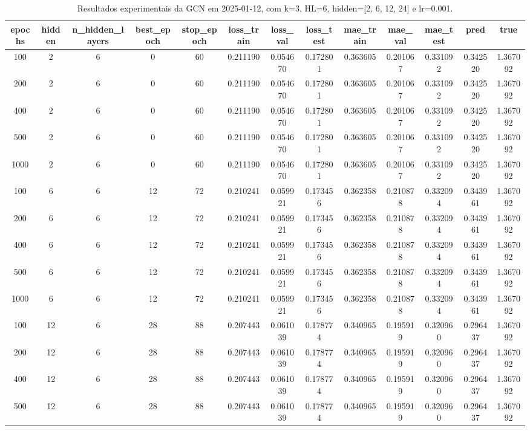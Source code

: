 \begin{table}[h]
\centering
\caption{Resultados experimentais da GCN em 2025-01-12, com k=3, HL=6, hidden=[2, 6, 12, 24] e lr=0.001.}
\label{tab:gcn_results_k3_hl6_d20250112}
\begin{tabular}{ccccccccccccc}
\toprule
epochs & hidden & n\_hidden\_layers & best\_epoch & stop\_epoch & loss\_train & loss\_val & loss\_test & mae\_train & mae\_val & mae\_test & pred & true \\
\midrule
100 & 2 & 6 & 0 & 60 & 0.211190 & 0.054670 & 0.172801 & 0.363605 & 0.201067 & 0.331092 & 0.342520 & 1.367092 \\
200 & 2 & 6 & 0 & 60 & 0.211190 & 0.054670 & 0.172801 & 0.363605 & 0.201067 & 0.331092 & 0.342520 & 1.367092 \\
400 & 2 & 6 & 0 & 60 & 0.211190 & 0.054670 & 0.172801 & 0.363605 & 0.201067 & 0.331092 & 0.342520 & 1.367092 \\
500 & 2 & 6 & 0 & 60 & 0.211190 & 0.054670 & 0.172801 & 0.363605 & 0.201067 & 0.331092 & 0.342520 & 1.367092 \\
1000 & 2 & 6 & 0 & 60 & 0.211190 & 0.054670 & 0.172801 & 0.363605 & 0.201067 & 0.331092 & 0.342520 & 1.367092 \\
100 & 6 & 6 & 12 & 72 & 0.210241 & 0.059921 & 0.173456 & 0.362358 & 0.210878 & 0.332094 & 0.343961 & 1.367092 \\
200 & 6 & 6 & 12 & 72 & 0.210241 & 0.059921 & 0.173456 & 0.362358 & 0.210878 & 0.332094 & 0.343961 & 1.367092 \\
400 & 6 & 6 & 12 & 72 & 0.210241 & 0.059921 & 0.173456 & 0.362358 & 0.210878 & 0.332094 & 0.343961 & 1.367092 \\
500 & 6 & 6 & 12 & 72 & 0.210241 & 0.059921 & 0.173456 & 0.362358 & 0.210878 & 0.332094 & 0.343961 & 1.367092 \\
1000 & 6 & 6 & 12 & 72 & 0.210241 & 0.059921 & 0.173456 & 0.362358 & 0.210878 & 0.332094 & 0.343961 & 1.367092 \\
100 & 12 & 6 & 28 & 88 & 0.207443 & 0.061039 & 0.178774 & 0.340965 & 0.195919 & 0.320960 & 0.296437 & 1.367092 \\
200 & 12 & 6 & 28 & 88 & 0.207443 & 0.061039 & 0.178774 & 0.340965 & 0.195919 & 0.320960 & 0.296437 & 1.367092 \\
400 & 12 & 6 & 28 & 88 & 0.207443 & 0.061039 & 0.178774 & 0.340965 & 0.195919 & 0.320960 & 0.296437 & 1.367092 \\
500 & 12 & 6 & 28 & 88 & 0.207443 & 0.061039 & 0.178774 & 0.340965 & 0.195919 & 0.320960 & 0.296437 & 1.367092 \\

\end{tabular}
\end{table}
